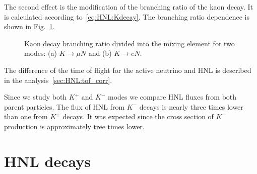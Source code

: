 \documentclass[../main.tex]{subfiles}
\begin{document}
The second effect is the modification of the branching ratio of the kaon decay. It is calculated according to~\autoref{eq:HNL:Kdecay}. The branching ratio dependence is shown in Fig.~\ref{fig:HNL:KdecayBR}.
\begin{figure}[!ht]
    \begin{minipage}[!ht]{0.49\linewidth}
    \end{minipage}
    \hfill
    \begin{minipage}[!ht]{0.49\linewidth}
    \end{minipage}
    \caption{Kaon decay branching ratio divided into the mixing element for two modes: (a) $K\to \mu N$ and (b) $K\to eN$.}
    \label{fig:HNL:KdecayBR}
\end{figure}

The difference of the time of flight for the active neutrino and HNL is described in the analysis~\autoref{sec:HNL:tof_corr}.

Since we study both $K^+$ and $K^-$ modes we compare HNL fluxes from both parent particles. The flux of HNL from $K^-$ decays is nearly three times lower than one from $K^+$ decays. It was expected since the cross section of $K^-$ production is approximately  tree times lower.

\section{HNL decays}
\end{document}
